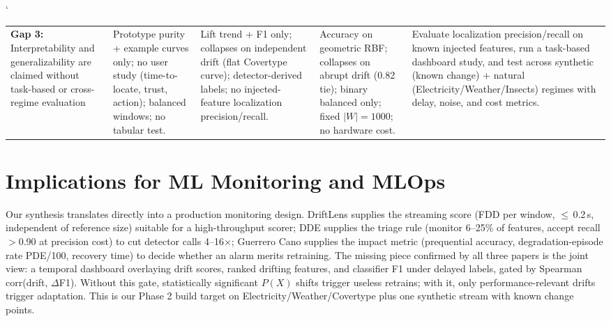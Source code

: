 `\documentclass[10pt]{article}
\begin{document}
\begin{landscape}
\begin{longtable}{
	L{3.2cm} L{4.2cm} L{4.2cm} L{4.2cm} L{4.6cm}
}
\textbf{Gap 3:} Interpretability and generalizability are claimed without task-based or cross-regime evaluation &
Prototype purity + example curves only; no user study (time-to-locate, trust, action); balanced windows; no tabular test. &
Lift trend + F1 only; collapses on independent drift (flat Covertype curve); detector-derived labels; no injected-feature localization precision/recall. &
Accuracy on geometric RBF; collapses on abrupt drift (0.82 tie); binary balanced only; fixed $|W|=1000$; no hardware cost. &
Evaluate localization precision/recall on known injected features, run a task-based dashboard study, and test across synthetic (known change) + natural (Electricity/Weather/Insects) regimes with delay, noise, and cost metrics. \\

\end{longtable}
\end{landscape}
\restoregeometry

\section{Implications for ML Monitoring and MLOps}

Our synthesis translates directly into a production monitoring design. DriftLens supplies the streaming score (FDD per window, $\leq$\,0.2\,s, independent of reference size) suitable for a high-throughput scorer; DDE supplies the triage rule (monitor 6--25\% of features, accept recall $>$0.90 at precision cost) to cut detector calls 4--16$\times$; Guerrero Cano supplies the impact metric (prequential accuracy, degradation-episode rate PDE/100, recovery time) to decide whether an alarm merits retraining. The missing piece confirmed by all three papers is the joint view: a temporal dashboard overlaying drift scores, ranked drifting features, and classifier F1 under delayed labels, gated by Spearman corr(drift, $\Delta$F1). Without this gate, statistically significant $P(X)$ shifts trigger useless retrains; with it, only performance-relevant drifts trigger adaptation. This is our Phase 2 build target on Electricity/Weather/Covertype plus one synthetic stream with known change points.
\end{document}
